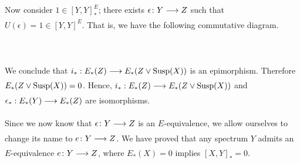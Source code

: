 \documentclass[../main]{subfiles}
\begin{document}
Now consider $1 \in \left[Y,Y\right]^E_{\ast}$; there exists $\epsilon\colon Y  \lar{} Z $ such that $U(\epsilon) = 1 \in \left[Y,Y\right]^E $. That is, we have the following commutative diagram.
~\\~\\
~\\~\\
We conclude that $i_{\ast}: E_{\ast}(Z) \lar{} E_{\ast}(Z \vee \te{Susp}(X))$ is an epimorphism.
Therefore $E_{\ast}(Z \vee \mathrm{Susp}(X))=0$. Hence, $i_{\ast}: E_{\ast}(Z) \lar{} E_{\ast}(Z \vee \te{Susp}(X))$ and $ \epsilon_{\ast}: E_{\ast}(Y) \lar{} E_{\ast}(Z)$ are isomorphisms.

Since we now know that $\epsilon\colon Y  \lar{} Z $ is an $E$-equivalence, we allow ourselves to change its name to $e\colon  Y \lar{}  Z $. We have proved that any spectrum $Y$ admits an $E$-equivalence $e\colon  Y \lar{}  Z $, where $E_{\ast}(X)=0$ implies $ \left[X,Y\right]_{\ast}=0$. 
\end{document}
